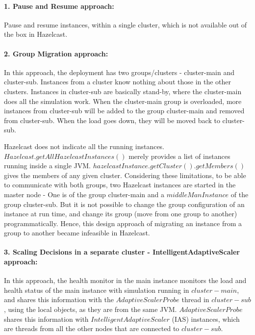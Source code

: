 \paragraph*{1. Pause and Resume approach:}
Pause and resume instances, within a single cluster, which is not available out of the box in Hazelcast.

\paragraph*{2. Group Migration approach:}
In this approach, the deployment has two groups/clusters - cluster-main and cluster-sub. Instances from a cluster know nothing about those in the other clusters. Instances in cluster-sub are basically stand-by, where the cluster-main does all the simulation work. When the cluster-main group is overloaded, more instances from cluster-sub will be added to the group cluster-main and removed from cluster-sub. When the load goes down, they will be moved back to cluster-sub. 

Hazelcast does not indicate all the running instances. $Hazelcast.getAllHazelcastInstances()$ merely provides a list of instances running inside a single JVM. $hazelcastInstance.getCluster().getMembers()$ gives the members of any given cluster. Considering these limitations, to be able to communicate with both groups, two Hazelcast instances are started in the master node - One is of the group cluster-main and a $middleMan Instance$ of the group cluster-sub. But it is not possible to change the group configuration of an instance at run time, and change its group (move from one group to another) programmatically. Hence, this design approach of migrating an instance from a group to another became infeasible in Hazelcast.

\paragraph*{3. Scaling Decisions in a separate cluster - IntelligentAdaptiveScaler approach:}
In this approach, the health monitor in the main instance monitors the load and health status of the main instance with simulation running in $cluster-main$, and shares this information with the $AdaptiveScalerProbe$ thread in $cluster-sub$, using the local objects, as they are from the same JVM. $AdaptiveScalerProbe$ shares this information with $IntelligentAdaptiveScaler$ (IAS) instances, which are threads from all the other nodes that are connected to $cluster-sub$. 

